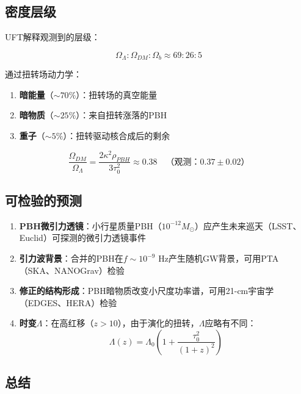 \subsection{密度层级}

UFT解释观测到的层级：

\begin{equation}
    \Omega_\Lambda : \Omega_{DM} : \Omega_b \approx 69 : 26 : 5
\end{equation}

通过扭转场动力学：

\begin{enumerate}
    \item \textbf{暗能量}（$\sim 70\%$）：扭转场的真空能量
    \item \textbf{暗物质}（$\sim 25\%$）：来自扭转涨落的PBH
    \item \textbf{重子}（$\sim 5\%$）：扭转驱动核合成后的剩余
\end{enumerate}

\begin{equation}
    \frac{\Omega_{DM}}{\Omega_\Lambda} = \frac{2\kappa^2 \rho_{PBH}}{3\tau_0^2} \approx 0.38 \quad \text{（观测：} 0.37 \pm 0.02\text{）}
\end{equation}

\subsection{可检验的预测}

\begin{enumerate}
    \item \textbf{PBH微引力透镜}：小行星质量PBH（$10^{-12} M_\odot$）应产生未来巡天（LSST、Euclid）可探测的微引力透镜事件
    
    \item \textbf{引力波背景}：合并的PBH在$f \sim 10^{-9}$ Hz产生随机GW背景，可用PTA（SKA、NANOGrav）检验
    
    \item \textbf{修正的结构形成}：PBH暗物质改变小尺度功率谱，可用21-cm宇宙学（EDGES、HERA）检验
    
    \item \textbf{时变$\Lambda$}：在高红移（$z > 10$），由于演化的扭转，$\Lambda$应略有不同：
    \begin{equation}
        \Lambda(z) = \Lambda_0 \left(1 + \frac{\tau_0^2}{(1+z)^2}\right)
    \end{equation}
\end{enumerate}

\subsection{总结}

